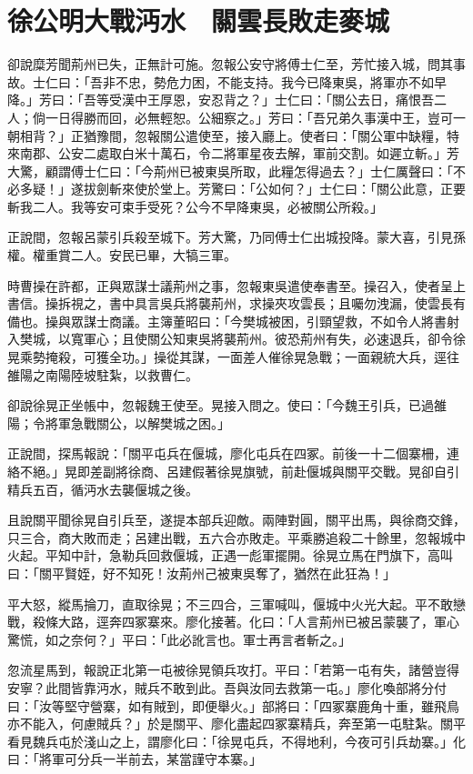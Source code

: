 
\chapter{徐公明大戰沔水　關雲長敗走麥城}

卻說糜芳聞荊州已失，正無計可施。忽報公安守將傅士仁至，芳忙接入城，問其事故。士仁曰：「吾非不忠，勢危力困，不能支持。我今已降東吳，將軍亦不如早降。」芳曰：「吾等受漢中王厚恩，安忍背之？」士仁曰：「關公去日，痛恨吾二人；倘一日得勝而回，必無輕恕。公細察之。」芳曰：「吾兄弟久事漢中王，豈可一朝相背？」正猶豫間，忽報關公遣使至，接入廳上。使者曰：「關公軍中缺糧，特來南郡、公安二處取白米十萬石，令二將軍星夜去解，軍前交割。如遲立斬。」芳大驚，顧謂傅士仁曰：「今荊州已被東吳所取，此糧怎得過去？」士仁厲聲曰：「不必多疑！」遂拔劍斬來使於堂上。芳驚曰：「公如何？」士仁曰：「關公此意，正要斬我二人。我等安可束手受死？公今不早降東吳，必被關公所殺。」

正說間，忽報呂蒙引兵殺至城下。芳大驚，乃同傅士仁出城投降。蒙大喜，引見孫權。權重賞二人。安民已畢，大犒三軍。

時曹操在許都，正與眾謀士議荊州之事，忽報東吳遣使奉書至。操召入，使者呈上書信。操拆視之，書中具言吳兵將襲荊州，求操夾攻雲長；且囑勿洩漏，使雲長有備也。操與眾謀士商議。主簿董昭曰：「今樊城被困，引頸望救，不如令人將書射入樊城，以寬軍心；且使關公知東吳將襲荊州。彼恐荊州有失，必速退兵，卻令徐晃乘勢掩殺，可獲全功。」操從其謀，一面差人催徐晃急戰；一面親統大兵，逕往雒陽之南陽陸坡駐紮，以救曹仁。

卻說徐晃正坐帳中，忽報魏王使至。晃接入問之。使曰：「今魏王引兵，已過雒陽；令將軍急戰關公，以解樊城之困。」

正說間，探馬報說：「關平屯兵在偃城，廖化屯兵在四冢。前後一十二個寨柵，連絡不絕。」晃即差副將徐商、呂建假著徐晃旗號，前赴偃城與關平交戰。晃卻自引精兵五百，循沔水去襲偃城之後。

且說關平聞徐晃自引兵至，遂提本部兵迎敵。兩陣對圓，關平出馬，與徐商交鋒，只三合，商大敗而走；呂建出戰，五六合亦敗走。平乘勝追殺二十餘里，忽報城中火起。平知中計，急勒兵回救偃城，正遇一彪軍擺開。徐晃立馬在門旗下，高叫曰：「關平賢姪，好不知死！汝荊州己被東吳奪了，猶然在此狂為！」

平大怒，縱馬掄刀，直取徐晃；不三四合，三軍喊叫，偃城中火光大起。平不敢戀戰，殺條大路，逕奔四冢寨來。廖化接著。化曰：「人言荊州已被呂蒙襲了，軍心驚慌，如之奈何？」平曰：「此必訛言也。軍士再言者斬之。」

忽流星馬到，報說正北第一屯被徐晃領兵攻打。平曰：「若第一屯有失，諸營豈得安寧？此間皆靠沔水，賊兵不敢到此。吾與汝同去救第一屯。」廖化喚部將分付曰：「汝等堅守營寨，如有賊到，即便舉火。」部將曰：「四冢寨鹿角十重，雖飛鳥亦不能入，何慮賊兵？」於是關平、廖化盡起四冢寨精兵，奔至第一屯駐紮。關平看見魏兵屯於淺山之上，謂廖化曰：「徐晃屯兵，不得地利，今夜可引兵劫寨。」化曰：「將軍可分兵一半前去，某當謹守本寨。」

